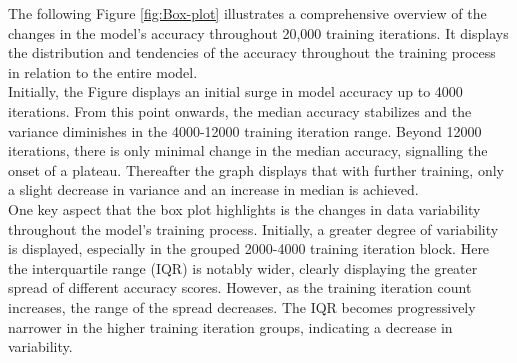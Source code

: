 The following Figure \ref{fig:Box-plot} illustrates a comprehensive overview of the changes in the model's accuracy throughout 20,000 training iterations. It displays the distribution and tendencies of the accuracy throughout the training process in relation to the entire model.\\

Initially, the Figure displays an initial surge in model accuracy up to 4000 iterations. From this point onwards, the median accuracy stabilizes and the variance diminishes in the 4000-12000 training iteration range. Beyond 12000 iterations, there is only minimal change in the median accuracy, signalling the onset of a plateau. Thereafter the graph displays that with further training, only a slight decrease in variance and an increase in median is achieved. \\

One key aspect that the box plot highlights is the changes in data variability throughout the model's training process. Initially, a greater degree of variability is displayed, especially in the grouped 2000-4000 training iteration block. Here the interquartile range (IQR) is notably wider, clearly displaying the greater spread of different accuracy scores.  However, as the training iteration count increases, the range of the spread decreases. The IQR becomes progressively narrower in the higher training iteration groups, indicating a decrease in variability. \\









